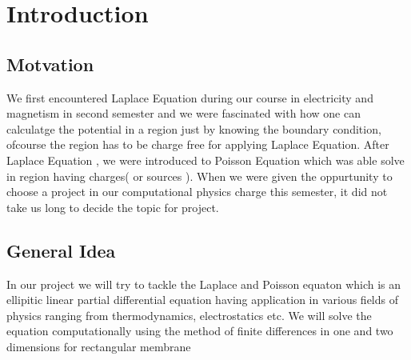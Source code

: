 	\section {Introduction}
    \subsection{Motvation}
    \noindent 
    We first encountered Laplace Equation during our course in electricity and magnetism in second semester and we were fascinated with how one can calculatge the potential in a region just by knowing the boundary condition, ofcourse the region has to be charge free for applying Laplace Equation. After Laplace Equation , we were introduced to Poisson Equation which was able solve in region having charges( or sources ). When we were given the oppurtunity to choose a project in our computational physics charge this semester, it did not take us long to decide the topic for project.
    \subsection{General Idea}
    \noindent
    In our project we will try to tackle the Laplace and Poisson equaton which is an ellipitic linear partial differential equation having application in various fields of physics ranging from thermodynamics, electrostatics etc. We will solve the equation computationally using the method of finite differences in one and two dimensions for rectangular membrane